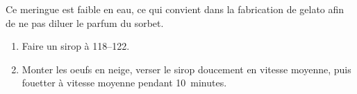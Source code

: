 \label{label:meringue-italienne-gelato}

\begin{ingredients}
\end{ingredients}

Ce meringue est faible en eau, ce qui convient dans la fabrication de
gelato afin de ne pas diluer le parfum du sorbet.

\begin{recipe}
  \begin{enumerate}

  \item Faire un sirop à 118--122\C.

  \item Monter les oeufs en neige, verser le sirop doucement en
    vitesse moyenne, puis fouetter à vitesse moyenne pendant
    10~minutes.

  \end{enumerate}
\end{recipe}

